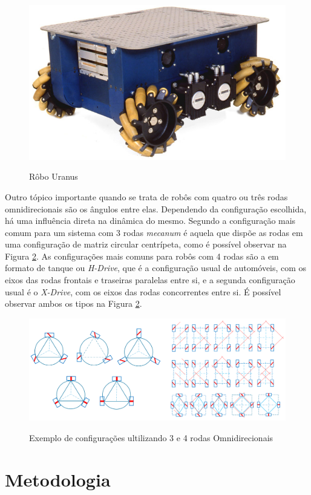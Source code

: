 \documentclass[deposito, acronym, symbols]{fei}
\begin{document}
\begin{figure}[!htb]
    \centering
    \caption{Rôbo Uranus}
    \includegraphics[width=0.45\linewidth]{Imagens/Exemplo de robo.jpg}
    \label{fig:Exemploderobo}
\end{figure}

Outro tópico importante quando se trata de robôs com quatro ou três rodas omnidirecionais são os ângulos entre elas. Dependendo da configuração escolhida, há uma influência direta na dinâmica do mesmo. Segundo \textcite{li2019topological} a configuração mais comum para um sistema com 3 rodas \textit{mecanum} é aquela que dispõe as rodas em uma configuração de matriz circular centrípeta, como é possível observar na Figura \ref{fig:configrodas}. As configurações mais comuns para robôs com 4 rodas são a em formato de tanque ou \textit{H-Drive}, que é a configuração usual de automóveis, com os eixos das rodas frontais e traseiras paralelas entre si, e a segunda configuração usual é o \textit{X-Drive}, com os eixos das rodas concorrentes entre si. É possível observar ambos os tipos na Figura \ref{fig:configrodas}.


\begin{figure}[!htb]
        \centering
        \caption{Exemplo de configurações ultilizando 3 e 4 rodas Omnidirecionais}
        \includegraphics[width=0.9\linewidth]{Imagens/Configurações de rodas.png}
        \label{fig:configrodas}      
\end{figure}


\chapter{Metodologia}
\end{document}
